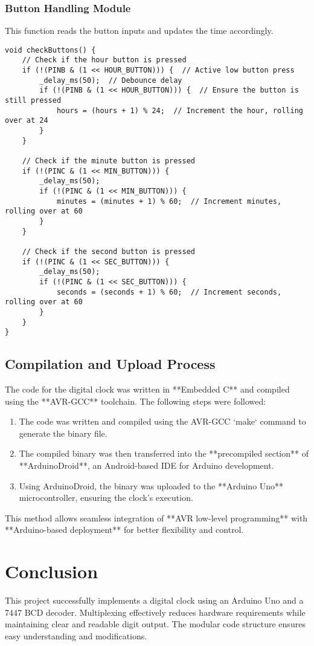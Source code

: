 \documentclass{article}
\begin{document}
\subsubsection{Button Handling Module}
This function reads the button inputs and updates the time accordingly.

\begin{lstlisting}[style=CStyle]
void checkButtons() {
    // Check if the hour button is pressed
    if (!(PINB & (1 << HOUR_BUTTON))) {  // Active low button press
        _delay_ms(50);  // Debounce delay
        if (!(PINB & (1 << HOUR_BUTTON))) {  // Ensure the button is still pressed
            hours = (hours + 1) % 24;  // Increment the hour, rolling over at 24
        }
    }

    // Check if the minute button is pressed
    if (!(PINC & (1 << MIN_BUTTON))) {
        _delay_ms(50);
        if (!(PINC & (1 << MIN_BUTTON))) {
            minutes = (minutes + 1) % 60;  // Increment minutes, rolling over at 60
        }
    }
    
    // Check if the second button is pressed
    if (!(PINC & (1 << SEC_BUTTON))) {
        _delay_ms(50);
        if (!(PINC & (1 << SEC_BUTTON))) {
            seconds = (seconds + 1) % 60;  // Increment seconds, rolling over at 60
        }
    }
}
\end{lstlisting}
\subsection{Compilation and Upload Process}
The code for the digital clock was written in **Embedded C** and compiled using the **AVR-GCC** toolchain. The following steps were followed:

\begin{enumerate}
    \item The code was written and compiled using the AVR-GCC `make` command to generate the binary file.
    \item The compiled binary was then transferred into the **precompiled section** of **ArduinoDroid**, an Android-based IDE for Arduino development.
    \item Using ArduinoDroid, the binary was uploaded to the **Arduino Uno** microcontroller, ensuring the clock's execution.
\end{enumerate}

This method allows seamless integration of **AVR low-level programming** with **Arduino-based deployment** for better flexibility and control.

\section{Conclusion}
This project successfully implements a digital clock using an Arduino Uno and a 7447 BCD decoder. Multiplexing effectively reduces hardware requirements while maintaining clear and readable digit output. The modular code structure ensures easy understanding and modifications.
\end{document}
